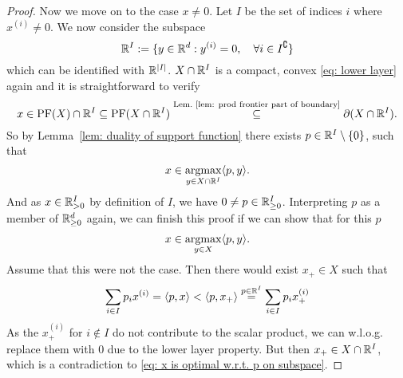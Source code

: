 \begin{proof}
	Now we move on to the case \(x\neq 0\). Let \(I\) be the set of indices \(i\)
	where \(x^{(i)}\neq 0\). We now consider the subspace
	\[
		\mathbb{R}^I := \{y\in \mathbb{R}^d : y^{(i)} = 0, \quad \forall i \in I^\complement\}
	\]
	which can be identified with \(\mathbb{R}^{|I|}\). \(X\cap\mathbb{R}^I\) is a compact,
	convex \ref{eq: lower layer} again and it is straightforward to verify
	\[
		x\in \operatorname{PF}(X)\cap \mathbb{R}^I
		\subseteq \operatorname{PF}(X\cap \mathbb{R}^I)
		\overset{\text{Lem.~\ref{lem: prod frontier part of boundary}}}\subseteq
		\partial(X\cap\mathbb{R}^I).
	\]
	So by Lemma~\ref{lem: duality of support function} there exists \(p\in
	\mathbb{R}^I\setminus \{0\}\), such that 
	\begin{equation}
		\label{eq: x is optimal w.r.t. p on subspace}
		x\in \operatorname*{argmax}_{y\in X\cap\mathbb{R}^I} \langle p, y\rangle.
	\end{equation}
	And as \(x\in\mathbb{R}_{>0}^I\) by definition of \(I\), we have \(0\neq
	p\in\mathbb{R}_{\ge 0}^I\). Interpreting \(p\) as a member of \(\mathbb{R}_{\ge
	0}^d\) again, we can finish this proof if we can show that for this \(p\)
	\[
		x\in\operatorname*{argmax}_{y\in X}\langle p, y\rangle.
	\]
	Assume that this were not the case. Then there would exist \(x_+\in X\)
	such that
	\[
		\sum_{i\in I}p_i x^{(i)}
		= \langle p, x\rangle
		< \langle p, x_+\rangle
		\overset{p\in\mathbb{R}^I}= \sum_{i\in I} p_i x_+^{(i)}
	\]
	As the \(x^{(i)}_+\) for \(i\notin I\) do not contribute to the scalar product,
	we can w.l.o.g. replace them with \(0\) due to the lower layer property.
	But then \(x_+\in X\cap \mathbb{R}^I\), which is a contradiction to \eqref{eq: x
	is optimal w.r.t. p on subspace}.
\end{proof}